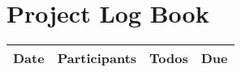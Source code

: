 \chapter*{Project Log Book}
\begin{tabular}{|l|l|l|l|}
\hline
Date & Participants & Todos & Due\\
\hline
\end{tabular}
